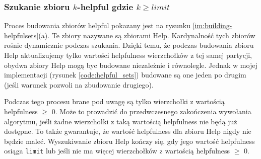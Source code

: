 \subsubsection{Szukanie zbioru $k$-helpful gdzie $k \geq limit$}
Proces budowania zbiorów helpful pokazany jest na rysunku \ref{im:building-helpfulsets}(a).
Te zbiory nazywane są zbiorami Help.
Kardynalność tych zbiorów rośnie dynamicznie podczas szukania.
Dzięki temu, że podczas budowania zbioru Help aktualizujemy tylko wartości helpfulness wierzchołków z tej samej partycji,
obydwa zbiory Help mogą byc budowane niezależnie i równolegle.
Jednak w mojej implementacji (rysunek \ref{code:helpful_sets}) budowane są one jeden po drugim
(jeśli warunek pozwoli na zbudowanie drugiego).

Podczas tego procesu brane pod uwagę są tylko wierzchołki z wartością helpfulness $\geq$ $0$.
Może to prowadzić do przedwczesnego zakończenia wywołania algorytmu, jeśli żadne wierzchołki z taką wartością
helpfulness nie będą już dostępne.
To także gwarantuje, że wartość helpfulness dla zbioru Help nigdy nie będzie maleć.
Wyszukiwanie zbioru Help kończy się, gdy jego wartość helpfulness osiąga \texttt{limit} lub jeśli nie ma więcej wierzchołków
z wartością helpfulness $\geq$ $0$.

